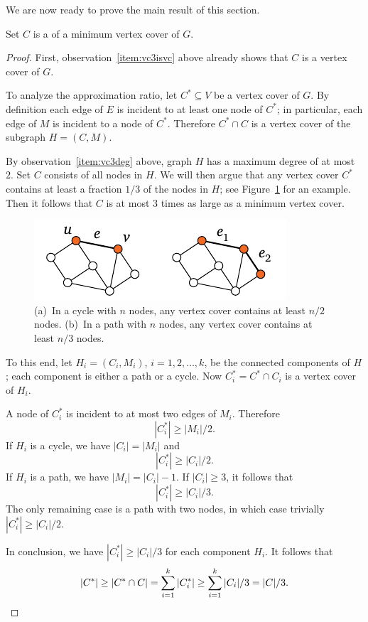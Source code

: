 We are now ready to prove the main result of this section.
\begin{lemma}
    Set $C$ is a  of a minimum vertex cover of $G$.
\end{lemma}
\begin{proof}
    First, observation~\ref{item:vc3isvc} above already shows that $C$ is a vertex cover of $G$.
    
    To analyze the approximation ratio, let $C^* \subseteq V$ be a vertex cover of $G$. By definition each edge of $E$ is incident to at least one node of $C^*$; in particular, each edge of $M$ is incident to a node of $C^*$. Therefore $C^* \cap C$ is a vertex cover of the subgraph $H = (C,M)$.
    
    By observation~\ref{item:vc3deg} above, graph $H$ has a maximum degree of at most~$2$. Set $C$ consists of all nodes in $H$. We will then argue that any vertex cover $C^*$ contains at least a fraction $1/3$ of the nodes in $H$; see Figure~\ref{fig:vc3c} for an example. Then it follows that $C$ is at most $3$ times as large as a minimum vertex cover.

\begin{figure}
    \centering
    \includegraphics[page=\PVCThreeApxC]{figs.pdf}
    \caption{(a)~In a cycle with $n$ nodes, any vertex cover contains at least $n/2$ nodes. (b)~In a path with $n$ nodes, any vertex cover contains at least $n/3$ nodes.}\label{fig:vc3c}
\end{figure}
    
    To this end, let $H_i = (C_i,M_i)$, $i = 1, 2, \dotsc, k$, be the connected components of $H$; each component is either a path or a cycle. Now $C_i^* = C^* \cap C_i$ is a vertex cover of $H_i$.

    A node of $C_i^*$ is incident to at most two edges of $M_i$. Therefore
    \[
        |C_i^*| \ge |M_i|/2.
    \]
    If $H_i$ is a cycle, we have $|C_i| = |M_i|$ and
    \[
        |C_i^*| \ge |C_i|/2.
    \]
    If $H_i$ is a path, we have $|M_i| = |C_i| - 1$. If $|C_i| \ge 3$, it follows that
    \[
        |C_i^*| \ge |C_i|/3.
    \]
    The only remaining case is a path with two nodes, in which case trivially $|C_i^*| \ge |C_i|/2$.

    In conclusion, we have $|C_i^*| \ge |C_i|/3$ for each component $H_i$. It follows that
    \[
        |C^*| \ge |C^* \cap C| = \sum_{i=1}^k |C_i^*| \ge \sum_{i=1}^k |C_i|/3 = |C|/3. \qedhere
    \]
\end{proof}

